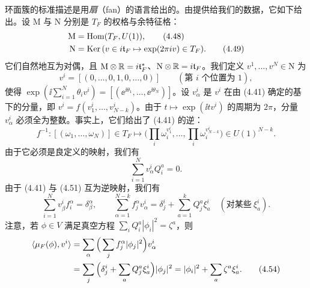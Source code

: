 环面簇的标准描述是用\emph{扇}（fan）的语言给出的。由提供给我们的数据，它如下给出。设 $\mathrm{M}$ 与 $\mathrm{N}$ 分别是 $T_F$ 的权格与余特征格：
\begin{align}
    \mathrm{M} &= \operatorname{Hom}(T_F,U(1)), \tag{4.48}\\
    \mathrm{N} &= \operatorname{Ker}\,(v\in i\mathfrak{t}_F\mapsto\exp(2\pi i v)\in T_F). \tag{4.49}
\end{align}
它们自然地互为对偶，且 $\mathrm{M}\otimes\mathbb{R}=i\mathfrak{t}_F^*$、$\mathrm{N}\otimes\mathbb{R}=i\mathfrak{t}_F$。我们定义 $v^1,\ldots,v^N\in\mathrm{N}$ 为
\begin{equation}
    v^i=[(0,\ldots,0,1,0,\ldots,0)]\qquad(\text{第 }i\text{ 个位置为 }1), \tag{4.50}
\end{equation}
使得 $\exp(\ii\sum_{i=1}^{N}\theta_i v^i)=[(\ee^{\ii\theta_1},\ldots,\ee^{\ii\theta_N})]$。设 $v_\alpha^i$ 是 $v^i$ 在由 (4.41) 确定的基下的分量，即 $v^i=f(v_1^i,\ldots,v_{N-k}^i)$。由于 $t\mapsto\exp(\ii tv^i)$ 的周期为 $2\pi$，分量 $v_\alpha^i$ 必须全为整数。事实上，它们给出了 (4.41) 的逆：
\begin{equation}
    f^{-1}:[(\omega_1,\ldots,\omega_N)]\in T_F\longmapsto
    \Big(\prod_i\omega_i^{v_1^i},\ldots,\prod_i\omega_i^{v_{N-k}^i}\Big)\in U(1)^{N-k}. \tag{4.51}
\end{equation}
由于它必须是良定义的映射，我们有
\begin{equation}
    \sum_{i=1}^{N}v_\alpha^i Q_i^a=0. \tag{4.52}
\end{equation}
由于 (4.41) 与 (4.51) 互为逆映射，我们有
\begin{equation}
    \sum_{i=1}^{N}v_\beta^i f_i^\alpha=\delta_\beta^\alpha,\qquad
    \sum_{\alpha=1}^{N-k}f_j^\alpha v_\alpha^i=\delta_j^i+\sum_{a=1}^{k}Q_j^a\xi_a^i
    \quad(\text{对某些}\ \xi_a^i). \tag{4.53}
\end{equation}
注意，若 $\phi\in V$ 满足真空方程 $\sum_i Q_i^a|\phi_i|^2=\zeta^a$，则
\begin{align}
    \langle\mu_F(\phi),v^i\rangle
    &=\sum_\alpha\Big(\sum_j f_j^\alpha|\phi_j|^2\Big)v_\alpha^i \notag\\
    &=\sum_j\Big(\delta_j^i+\sum_a Q_j^a\xi_a^i\Big)|\phi_j|^2
    =|\phi_i|^2+\sum_a\zeta^a\xi_a^i. \tag{4.54}
\end{align}
